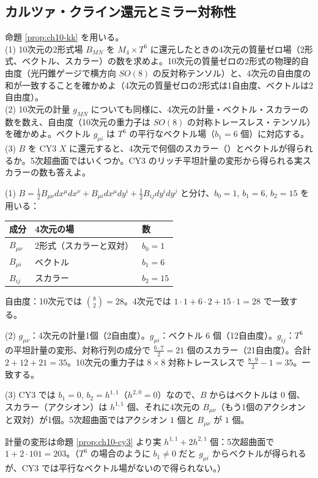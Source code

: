 \subsection{カルツァ・クライン還元とミラー対称性}

\begin{problem}[難易度 B]\label{ch10-prob-kk}
命題 \ref{prop:ch10-kk} を用いる。\\
(1) 10次元の2形式場 $B_{MN}$ を $M_4\times T^6$ に還元したときの4次元の質量ゼロ場（2形式、ベクトル、スカラー）の数を求めよ。10次元の質量ゼロの2形式の物理的自由度（光円錐ゲージで横方向 $SO(8)$ の反対称テンソル）と、4次元の自由度の和が一致することを確かめよ（4次元の質量ゼロの2形式は1自由度、ベクトルは2自由度）。\\
(2) 10次元の計量 $g_{MN}$ についても同様に、4次元の計量・ベクトル・スカラーの数を数え、自由度（10次元の重力子は $SO(8)$ の対称トレースレス・テンソル）を確かめよ。ベクトル $g_{\mu i}$ は $T^6$ の平行なベクトル場（$b_1=6$ 個）に対応する。\\
(3) $B$ を CY3 $X$ に還元すると、4次元で何個のスカラー（）とベクトルが得られるか。5次超曲面ではいくつか。CY3 のリッチ平坦計量の変形から得られる実スカラーの数も答えよ。
\end{problem}

\begin{solution}
(1) $B=\frac12B_{\mu\nu}dx^\mu dx^\nu+B_{\mu i}dx^\mu dy^i+\frac12B_{ij}dy^idy^j$ と分け、$b_0=1$, $b_1=6$, $b_2=15$ を用いる：
\begin{center}
\begin{tabular}{lll}
成分 & 4次元の場 & 数\\ \hline
$B_{\mu\nu}$ & 2形式（スカラーと双対） & $b_0=1$\\
$B_{\mu i}$ & ベクトル & $b_1=6$\\
$B_{ij}$ & スカラー & $b_2=15$
\end{tabular}
\end{center}
自由度：10次元では $\binom82=28$。4次元では $1\cdot1+6\cdot2+15\cdot1=28$ で一致する。

(2) $g_{\mu\nu}$：4次元の計量1個（2自由度）。$g_{\mu i}$：ベクトル $6$ 個（12自由度）。$g_{ij}$：$T^6$ の平坦計量の変形、対称行列の成分で $\frac{6\cdot7}{2}=21$ 個のスカラー（21自由度）。合計 $2+12+21=35$。10次元の重力子は $8\times8$ 対称トレースレスで $\frac{8\cdot9}{2}-1=35$。一致する。

(3) CY3 では $b_1=0$, $b_2=h^{1,1}$（$h^{2,0}=0$）なので、$B$ からはベクトルは $0$ 個、スカラー（アクシオン）は $h^{1,1}$ 個、それに4次元の $B_{\mu\nu}$（もう1個のアクシオンと双対）が1個。5次超曲面ではアクシオン $1$ 個と $B_{\mu\nu}$ が $1$ 個。

計量の変形は命題 \ref{prop:ch10-cy3} より実 $h^{1,1}+2h^{2,1}$ 個：5次超曲面で $1+2\cdot101=203$。（$T^6$ の場合のように $b_1\neq0$ だと $g_{\mu i}$ からベクトルが得られるが、CY3 では平行なベクトル場がないので得られない。）
\end{solution}

